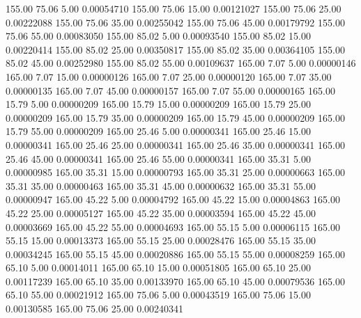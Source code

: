     155.00     75.06      5.00     0.00054710
    155.00     75.06     15.00     0.00121027
    155.00     75.06     25.00     0.00222088
    155.00     75.06     35.00     0.00255042
    155.00     75.06     45.00     0.00179792
    155.00     75.06     55.00     0.00083050
    155.00     85.02      5.00     0.00093540
    155.00     85.02     15.00     0.00220414
    155.00     85.02     25.00     0.00350817
    155.00     85.02     35.00     0.00364105
    155.00     85.02     45.00     0.00252980
    155.00     85.02     55.00     0.00109637
    165.00      7.07      5.00     0.00000146
    165.00      7.07     15.00     0.00000126
    165.00      7.07     25.00     0.00000120
    165.00      7.07     35.00     0.00000135
    165.00      7.07     45.00     0.00000157
    165.00      7.07     55.00     0.00000165
    165.00     15.79      5.00     0.00000209
    165.00     15.79     15.00     0.00000209
    165.00     15.79     25.00     0.00000209
    165.00     15.79     35.00     0.00000209
    165.00     15.79     45.00     0.00000209
    165.00     15.79     55.00     0.00000209
    165.00     25.46      5.00     0.00000341
    165.00     25.46     15.00     0.00000341
    165.00     25.46     25.00     0.00000341
    165.00     25.46     35.00     0.00000341
    165.00     25.46     45.00     0.00000341
    165.00     25.46     55.00     0.00000341
    165.00     35.31      5.00     0.00000985
    165.00     35.31     15.00     0.00000793
    165.00     35.31     25.00     0.00000663
    165.00     35.31     35.00     0.00000463
    165.00     35.31     45.00     0.00000632
    165.00     35.31     55.00     0.00000947
    165.00     45.22      5.00     0.00004792
    165.00     45.22     15.00     0.00004863
    165.00     45.22     25.00     0.00005127
    165.00     45.22     35.00     0.00003594
    165.00     45.22     45.00     0.00003669
    165.00     45.22     55.00     0.00004693
    165.00     55.15      5.00     0.00006115
    165.00     55.15     15.00     0.00013373
    165.00     55.15     25.00     0.00028476
    165.00     55.15     35.00     0.00034245
    165.00     55.15     45.00     0.00020886
    165.00     55.15     55.00     0.00008259
    165.00     65.10      5.00     0.00014011
    165.00     65.10     15.00     0.00051805
    165.00     65.10     25.00     0.00117239
    165.00     65.10     35.00     0.00133970
    165.00     65.10     45.00     0.00079536
    165.00     65.10     55.00     0.00021912
    165.00     75.06      5.00     0.00043519
    165.00     75.06     15.00     0.00130585
    165.00     75.06     25.00     0.00240341
